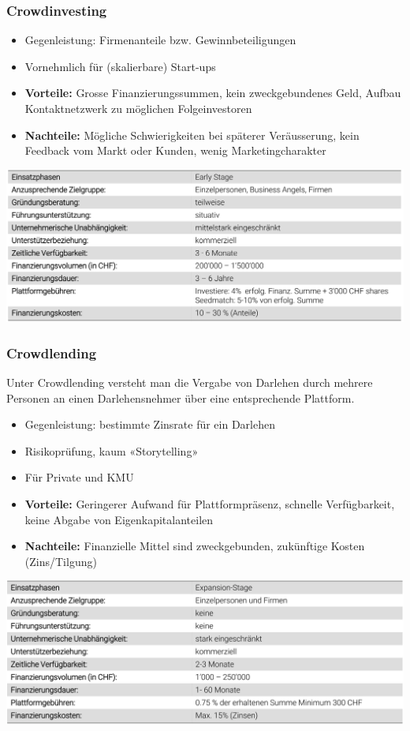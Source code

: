 \subsubsection{Crowdinvesting}
\begin{itemize}
	\item Gegenleistung: Firmenanteile bzw. Gewinnbeteiligungen
	\item Vornehmlich für (skalierbare) Start-ups
\end{itemize}
\begin{itemize}
	\item \textbf{Vorteile:} Grosse Finanzierungssummen, kein zweckgebundenes Geld, Aufbau Kontaktnetzwerk zu möglichen Folgeinvestoren
	\item \textbf{Nachteile:} Mögliche Schwierigkeiten bei späterer Veräusserung, kein Feedback vom Markt oder Kunden, wenig Marketingcharakter
\end{itemize}
\includegraphics[width=1\linewidth]{images/crowdinvesting}

\subsubsection{Crowdlending}
Unter Crowdlending versteht man die Vergabe von Darlehen durch mehrere Personen an einen Darlehensnehmer über eine entsprechende Plattform.
\begin{itemize}
	\item Gegenleistung: bestimmte Zinsrate für ein Darlehen
	\item Risikoprüfung, kaum «Storytelling»
	\item Für Private und KMU
\end{itemize}
\begin{itemize}
	\item \textbf{Vorteile: }Geringerer Aufwand für Plattformpräsenz, schnelle Verfügbarkeit, keine Abgabe von Eigenkapitalanteilen
	\item \textbf{Nachteile:} Finanzielle Mittel sind zweckgebunden, zukünftige Kosten (Zins/Tilgung)
\end{itemize}
\includegraphics[width=1\linewidth]{images/crowdlending}

